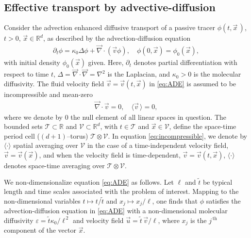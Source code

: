 \documentclass[11pt]{amsart}
\newcommand{\Tc}{\mathcal{T}}
\newcommand{\Vc}{\mathcal{V}}
\begin{document}
\subsection{Effective transport by
  advective-diffusion} \label{sec:Eff_Trans}  
%
Consider the advection enhanced diffusive transport of a passive
tracer $\phi(t,\vec{x}\,)$, $t>0$, $\vec{x}\in\mathbb{R}^d$, as described by
the advection-diffusion equation 
%
\begin{align}\label{eq:ADE}
  \partial_t\phi=\kappa_0\Delta \phi+\vec{\nabla}\cdot(\vec{v}\phi), \quad
  \phi(0,\vec{x})=\phi_0(\vec{x}),
\end{align}
% 
with initial density $\phi_0(\vec{x})$ given. Here, $\partial_t$ denotes partial
differentiation with respect to time $t$, $\Delta=\vec{\nabla}\cdot\vec{\nabla}=\nabla^2$ is
the Laplacian, and $\kappa_0>0$ is the molecular diffusivity. The fluid
velocity field $\vec{v}=\vec{v}(t,\vec{x})$ in \eqref{eq:ADE} is
assumed to be incompressible and mean-zero 
%
\begin{align}\label{eq:incompressible}
  \vec{\nabla}\cdot\vec{v}=0, \quad
  \langle\vec{v}\,\rangle=0,
\end{align}
%
where we denote by $0$ the null element of all linear spaces in
question. The bounded sets $\Tc\subset\mathbb{R}$ and     
$\Vc\subset\mathbb{R}^d$, with $t\in\Tc$ and $\vec{x}\in\Vc$, define the
space-time period cell ($(d+1)$--torus) $\Tc\otimes\Vc$. In equation
\eqref{eq:incompressible}, we denote by $\langle\cdot\rangle$ spatial averaging over
$\Vc$ in the case of a time-independent velocity field,
$\vec{v}=\vec{v}(\vec{x})$, and when the velocity field is
time-dependent, $\vec{v}=\vec{v}(t,\vec{x})$, $\langle\cdot\rangle$ denotes space-time
averaging over $\Tc\otimes\Vc$. 



We non-dimensionalize equation
\eqref{eq:ADE} as follows. Let $\ell$ and $\tilde{t}$ be typical length
and time scales associated with the problem of interest. Mapping to
the non-dimensional variables $t\mapsto t/\tilde{t}$ and $x_j\mapsto x_j/\ell$, one
finds that $\phi$ satisfies the advection-diffusion equation in
\eqref{eq:ADE} with a non-dimensional molecular diffusivity
$\varepsilon=\tilde{t}\kappa_0/\ell^{\,2}$ and velocity field
$\vec{u}=\tilde{t}\,\vec{v}/\ell$, where $x_j$ is the $j^{\,\text{th}}$
component of the vector $\vec{x}$. 
\end{document}
